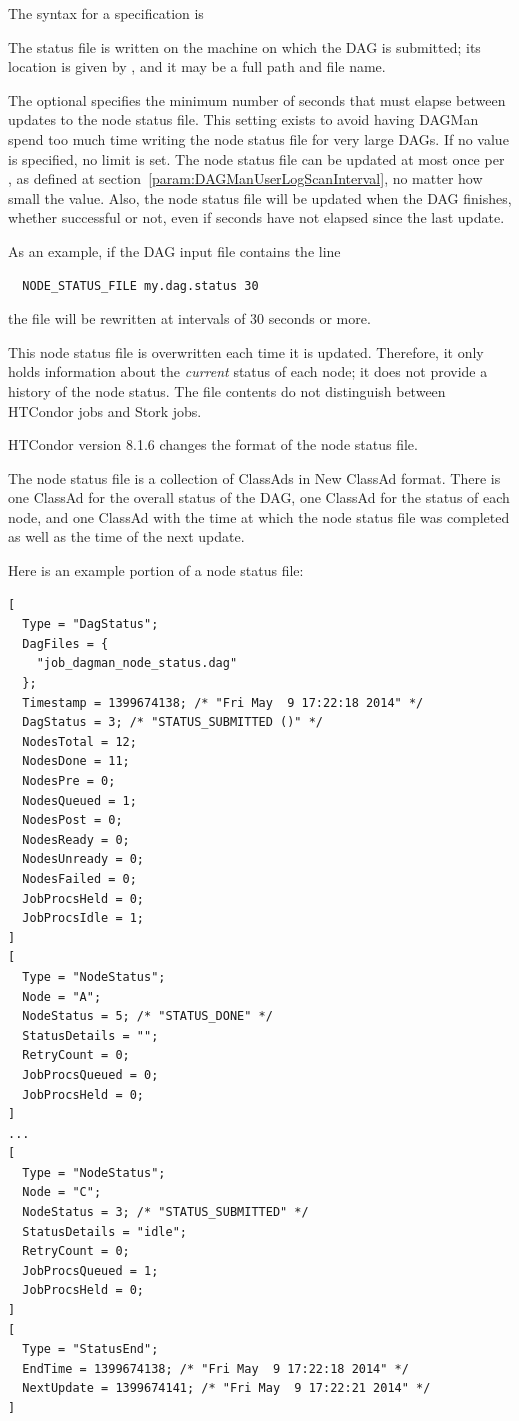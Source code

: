 The syntax for a  specification is

  

The status file is written on the machine on which the DAG is submitted;
its location is given by ,
and it may be a full path and file name.

The optional  specifies the minimum number of seconds
that must elapse between updates to the node status file.
This setting exists to avoid having DAGMan spend too much time writing
the node status file for very large DAGs.
If no value is specified, no limit is set.
The node status file can be updated at most once
per ,
as defined at section~\ref{param:DAGManUserLogScanInterval},
no matter how small the  value.
Also, the node status file will be updated when the DAG finishes,
whether successful or not, even if  seconds
have not elapsed since the last update.

As an example, if the DAG input file contains the line
\begin{verbatim}
  NODE_STATUS_FILE my.dag.status 30
\end{verbatim}
the file  will be rewritten at intervals of 30 seconds
or more.

This node status file is overwritten each time it is updated.
Therefore, it only holds information about the \emph{current} status 
of each node; it does not provide a history of the node status.
The file contents do not distinguish between HTCondor jobs and Stork jobs.

\Note HTCondor version 8.1.6 changes the format of the node status
file.

The node status file is a collection of ClassAds in New ClassAd format.
There is one ClassAd for the overall status of the DAG, one ClassAd
for the status of each node, and one ClassAd with the time at which
the node status file was completed as well as the time of the next update.

Here is an example portion of a node status file:

\begin{verbatim}
[
  Type = "DagStatus";
  DagFiles = {
    "job_dagman_node_status.dag"
  };
  Timestamp = 1399674138; /* "Fri May  9 17:22:18 2014" */
  DagStatus = 3; /* "STATUS_SUBMITTED ()" */
  NodesTotal = 12;
  NodesDone = 11;
  NodesPre = 0;
  NodesQueued = 1;
  NodesPost = 0;
  NodesReady = 0;
  NodesUnready = 0;
  NodesFailed = 0;
  JobProcsHeld = 0;
  JobProcsIdle = 1;
]
[
  Type = "NodeStatus";
  Node = "A";
  NodeStatus = 5; /* "STATUS_DONE" */
  StatusDetails = "";
  RetryCount = 0;
  JobProcsQueued = 0;
  JobProcsHeld = 0;
]
...
[
  Type = "NodeStatus";
  Node = "C";
  NodeStatus = 3; /* "STATUS_SUBMITTED" */
  StatusDetails = "idle";
  RetryCount = 0;
  JobProcsQueued = 1;
  JobProcsHeld = 0;
]
[
  Type = "StatusEnd";
  EndTime = 1399674138; /* "Fri May  9 17:22:18 2014" */
  NextUpdate = 1399674141; /* "Fri May  9 17:22:21 2014" */
]
\end{verbatim}

